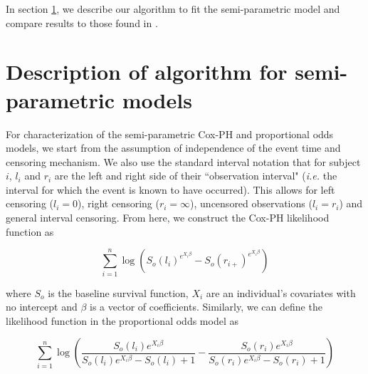 \documentclass[article]{jss}
\begin{document}
	 In section \ref{sec:alg1}, we describe our algorithm to fit the semi-parametric model and compare results to those found in . 
	 
\section[alg1]{Description of algorithm for semi-parametric models}
\label{sec:alg1}
	 
	 For characterization of the semi-parametric Cox-PH and proportional odds models, we start from the assumption of independence of the event time and censoring mechanism. We also use the standard interval notation that for subject $i$, $l_i$ and $r_i$ are the left and right side of their ``observation interval" (\emph{i.e.} the interval for which the event is known to have occurred). This allows for left censoring ($l_i = 0$), right censoring ($r_i = \infty$), uncensored observations ($l_i = r_i$) and general interval censoring. From here, we construct the Cox-PH likelihood function as
	 
	 \[
	 \displaystyle \sum_{i = 1}^n \log \left( S_o(l_i)^{e^{X_i \beta} } - S_o(r_{i+})^{e^{X_i \beta}} \right)
	 \]
	 
	 where $S_o$ is the baseline survival function, $X_i$ are an individual's covariates with no intercept and $\beta$ is a vector of coefficients. Similarly, we can define the likelihood function in the proportional odds model as
	 
	  \[
	 \displaystyle \sum_{i = 1}^n \log \left( \frac{S_o(l_i) e^{X_i \beta}}{S_o(l_i) e^{X_i \beta} -S_o(l_i) + 1 } -\frac{S_o(r_i) e^{X_i \beta}}{S_o(r_i) e^{X_i \beta} -S_o(r_i) + 1 }  \right)
	 \]
	 
\end{document}
